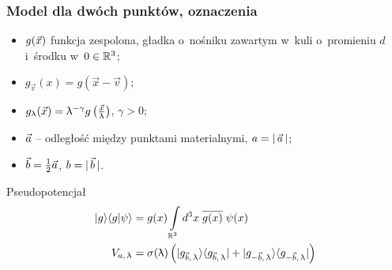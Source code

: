 \documentclass[10pt,t]{beamer}
\begin{document}
\begin{frame}
  \frametitle{Model dla dwóch punktów, oznaczenia}


  \begin{itemize}
    \RaggedRight

  \item $g( \vec{ x } )$ funkcja zespolona, gładka o~nośniku
    zawartym w~kuli o~promieniu $d$ i~środku w~$0 \in \mathbb{R}^{ 3 }$;

  \item $g_{ \vec{ v } }( x ) = g( \vec{ x } - \vec{ v } )$;

  \item $g_{ \uplambda }( \vec{ x } ) = \uplambda^{ -\gamma } g\left( \frac{ \vec{ x } }{ \uplambda } \right)$,
    $\gamma > 0$;

  \item $\vec{ a }$ -- odległość między punktami materialnymi,
    $a = |\, {  \vec{ a }  } \,|$;

  \item $\vec{ b } = \frac{ 1 }{ 2 } \vec{ a }$, $b = |\, {  \vec{ b }  } \,|$.

  \end{itemize}



  Pseudopotencjał
  \begin{subequations}
    \begin{align}
      \label{eq:Efekt-Casimira-21-A}
      | g \rangle \langle g | \psi \rangle
      &= g( x ) \int\limits_{ \mathbb{R}^{ 3 } } d^{ 3 } x \; \overline{ g( x ) } \;
        \psi( x ) \\
      \label{eq:Efekt-Casimira-21-B}
      V_{ a,\, \uplambda }
      &=
        \sigma( \uplambda ) \left( | g_{ \vec{ b },\, \uplambda } \rangle \langle g_{ \vec{ b },\, \uplambda } |
        + | g_{ -\vec{ b },\, \uplambda } \rangle \langle g_{ -\vec{ b },\, \uplambda } | \right)
    \end{align}
  \end{subequations}

\end{frame}
\end{document}

